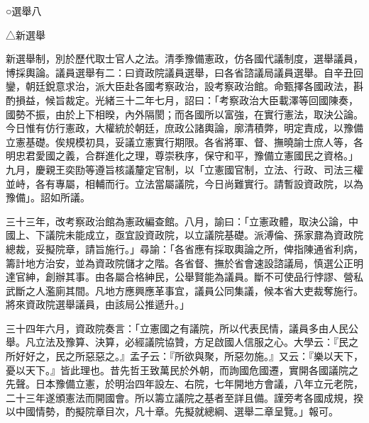 
\begin{pinyinscope}
○選舉八

△新選舉

新選舉制，別於歷代取士官人之法。清季豫備憲政，仿各國代議制度，選舉議員，博採輿論。議員選舉有二：曰資政院議員選舉，曰各省諮議局議員選舉。自辛丑回鑾，朝廷銳意求治，派大臣赴各國考察政治，設考察政治館。命甄擇各國政法，斟酌損益，候旨裁定。光緒三十二年七月，詔曰：「考察政治大臣載澤等回國陳奏，國勢不振，由於上下相暌，內外隔閡；而各國所以富強，在實行憲法，取決公論。今日惟有仿行憲政，大權統於朝廷，庶政公諸輿論，廓清積弊，明定責成，以豫備立憲基礎。俟規模初具，妥議立憲實行期限。各省將軍、督、撫曉諭士庶人等，各明忠君愛國之義，合群進化之理，尊崇秩序，保守和平，豫備立憲國民之資格。」九月，慶親王奕劻等遵旨核議釐定官制，以「立憲國官制，立法、行政、司法三權並峙，各有專屬，相輔而行。立法當屬議院，今日尚難實行。請暫設資政院，以為豫備」。詔如所議。

三十三年，改考察政治館為憲政編查館。八月，諭曰：「立憲政體，取決公論，中國上、下議院未能成立，亟宜設資政院，以立議院基礎。派溥倫、孫家鼐為資政院總裁，妥擬院章，請旨施行。」尋諭：「各省應有採取輿論之所，俾指陳通省利病，籌計地方治安，並為資政院儲才之階。各省督、撫於省會速設諮議局，慎選公正明達官紳，創辦其事。由各屬合格紳民，公舉賢能為議員。斷不可使品行悖謬、營私武斷之人濫廁其間。凡地方應興應革事宜，議員公同集議，候本省大吏裁奪施行。將來資政院選舉議員，由該局公推遞升。」

三十四年六月，資政院奏言：「立憲國之有議院，所以代表民情，議員多由人民公舉。凡立法及豫算、決算，必經議院協贊，方足啟國人信服之心。大學云：『民之所好好之，民之所惡惡之。』孟子云：『所欲與聚，所惡勿施。』又云：『樂以天下，憂以天下。』皆此理也。昔先哲王致萬民於外朝，而詢國危國遷，實開各國議院之先聲。日本豫備立憲，於明治四年設左、右院，七年開地方會議，八年立元老院，二十三年遂頒憲法而開國會。所以籌立議院之基者至詳且備。謹旁考各國成規，揆以中國情勢，酌擬院章目次，凡十章。先擬就總綱、選舉二章呈覽。」報可。


\end{pinyinscope}
